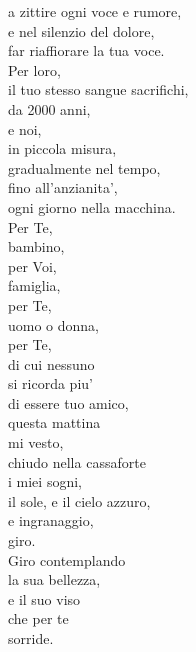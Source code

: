 \begin{haiku}
a zittire ogni voce e rumore,\\
e nel silenzio del dolore,\\
far riaffiorare la tua voce.\\
Per loro,\\
il tuo stesso sangue sacrifichi, \\
da 2000 anni,\\
e noi,\\
in piccola misura,\\
gradualmente nel tempo,\\
fino all'anzianita',\\
ogni giorno nella macchina.\\
Per Te,\\
bambino,\\
per Voi,\\
famiglia,\\
per Te,\\
uomo o donna,\\
per Te,\\
di cui nessuno\\
si ricorda piu'\\
di essere tuo amico,\\
questa mattina\\
mi vesto,\\
chiudo nella cassaforte\\
i miei sogni,\\
il sole, e il cielo azzuro,\\
e ingranaggio,\\
giro.\\
Giro contemplando\\
la sua bellezza,\\
e il suo viso\\
che per te\\
sorride.\\
\end{haiku}


